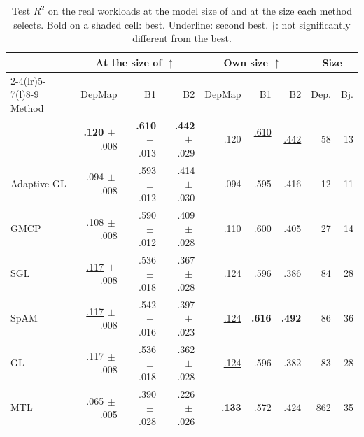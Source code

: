\begin{table}[t]
\caption{Test $R^2$ on the real workloads at the model size of \sys{} and at the size each method selects. Bold on a shaded cell: best. Underline: second best. $\dagger$: not significantly different from the best.}
\label{tab:real}
\centering
\scriptsize
\setlength{\tabcolsep}{1.3pt}
\begin{tabular*}{\columnwidth}{@{\extracolsep{\fill}}lrrrrrrrr@{}}
\toprule
& \multicolumn{3}{c}{At the size of \sys{} $\uparrow$} & \multicolumn{3}{c}{Own size $\uparrow$} & \multicolumn{2}{c}{Size}\\
\cmidrule(lr){2-4}\cmidrule(lr){5-7}\cmidrule(l){8-9}
Method & DepMap & B1 & B2 & DepMap & B1 & B2 & Dep. & Bj.\\
\midrule
\textbf{\sys{}} & \cellcolor{best}\textbf{.120}{\tiny$\,\pm$.008} & \cellcolor{best}\textbf{.610}{\tiny$\,\pm$.013} & \cellcolor{best}\textbf{.442}{\tiny$\,\pm$.029} & .120 & \underline{.610}$^\dagger$ & \underline{.442} & 58 & 13\\
Adaptive GL & .094{\tiny$\,\pm$.008} & \underline{.593}{\tiny$\,\pm$.012} & \underline{.414}{\tiny$\,\pm$.030} & .094 & .595 & .416 & 12 & 11\\
GMCP & .108{\tiny$\,\pm$.008} & .590{\tiny$\,\pm$.012} & .409{\tiny$\,\pm$.028} & .110 & .600 & .405 & 27 & 14\\
SGL & \underline{.117}{\tiny$\,\pm$.008} & .536{\tiny$\,\pm$.018} & .367{\tiny$\,\pm$.028} & \underline{.124} & .596 & .386 & 84 & 28\\
SpAM & \underline{.117}{\tiny$\,\pm$.008} & .542{\tiny$\,\pm$.016} & .397{\tiny$\,\pm$.023} & \underline{.124} & \cellcolor{best}\textbf{.616} & \cellcolor{best}\textbf{.492} & 86 & 36\\
GL & \underline{.117}{\tiny$\,\pm$.008} & .536{\tiny$\,\pm$.018} & .362{\tiny$\,\pm$.028} & \underline{.124} & .596 & .382 & 83 & 28\\
MTL & .065{\tiny$\,\pm$.005} & .390{\tiny$\,\pm$.028} & .226{\tiny$\,\pm$.026} & \cellcolor{best}\textbf{.133} & .572 & .424 & 862 & 35\\
\bottomrule
\end{tabular*}
\end{table}
